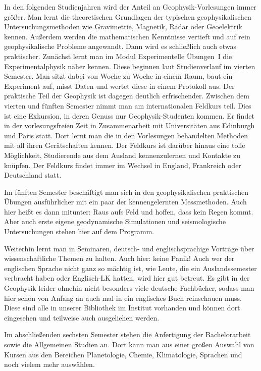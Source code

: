 \begin{multicols}{2}
In den folgenden Studienjahren wird der Anteil an Geophysik-Vorlesungen immer größer.
Man lernt die theoretischen Grundlagen der typischen geophysikalischen Untersuchungsmethoden wie Gravimetrie, Magnetik, Radar oder Geoelektrik kennen.
Außerdem werden die mathematischen Kenntnisse vertieft und auf rein geophysikalische Probleme angewandt.
Dann wird es schließlich auch etwas praktischer.
Zunächst lernt man im Modul Experimentelle Übungen~I die Experimentalphysik näher kennen.
Diese beginnen laut Studienverlauf im vierten Semester.
Man sitzt dabei von Woche zu Woche in einem Raum, baut ein Experiment auf, misst Daten und wertet diese in einem Protokoll aus.
Der praktische Teil der Geophysik ist dagegen deutlich erfrischender.
Zwischen dem vierten und fünften Semester nimmt man am internationalen Feldkurs teil.
Dies ist eine Exkursion, in deren Genuss nur Geophysik-Studenten kommen.
Er findet in der vorlesungsfreien Zeit in Zusammenarbeit mit Universitäten aus Edinburgh und Paris statt.
Dort lernt man die in den Vorlesungen behandelten Methoden mit all ihren Gerätschaften kennen.
Der Feldkurs ist darüber hinaus eine tolle Möglichkeit, Studierende aus dem Ausland kennenzulernen und Kontakte zu knüpfen.
Der Feldkurs findet immer im Wechsel in England, Frankreich oder Deutschland statt.

Im fünften Semester beschäftigt man sich in den geophysikalischen praktischen Übungen ausführlicher mit ein paar der kennengelernten Messmethoden.
Auch hier heißt es dann mitunter: Raus aufs Feld und hoffen, dass kein Regen kommt.
Aber auch erste eigene geodynamische Simulationen und seismologische Untersuchungen stehen hier auf dem Programm.

Weiterhin lernt man in Seminaren, deutsch- und englischsprachige Vorträge über wissenschaftliche Themen zu halten.
Auch hier: keine Panik!
Auch wer der englischen Sprache nicht ganz so mächtig ist, wie Leute, die ein Auslandssemester verbracht haben oder Englisch-LK hatten, wird hier gut betreut.
Es gibt in der Geophysik leider ohnehin nicht besonders viele deutsche Fachbücher, sodass man hier schon von Anfang an auch mal in ein englisches Buch reinschauen muss.
Diese sind alle in unserer Bibliothek im Institut vorhanden und können dort eingesehen und teilweise auch ausgeliehen werden.

Im abschließenden sechsten Semester stehen die Anfertigung der Bachelorarbeit sowie die Allgemeinen Studien an.
Dort kann man aus einer großen Auswahl von Kursen aus den Bereichen Planetologie, Chemie, Klimatologie, Sprachen und noch vielem mehr auswählen.


\end{multicols}

